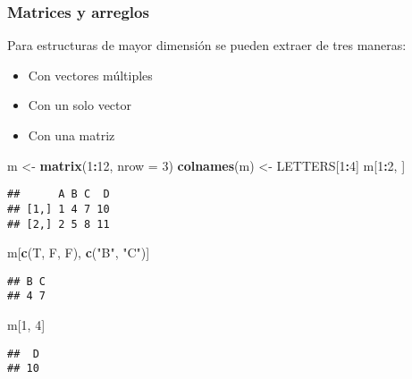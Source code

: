 \documentclass[]{article}
\newenvironment{Shaded}{\begin{snugshade}}{\end{snugshade}}
\newcommand{\KeywordTok}[1]{\textcolor[rgb]{0.13,0.29,0.53}{\textbf{#1}}}
\newcommand{\DataTypeTok}[1]{\textcolor[rgb]{0.13,0.29,0.53}{#1}}
\newcommand{\DecValTok}[1]{\textcolor[rgb]{0.00,0.00,0.81}{#1}}
\newcommand{\StringTok}[1]{\textcolor[rgb]{0.31,0.60,0.02}{#1}}
\newcommand{\OperatorTok}[1]{\textcolor[rgb]{0.81,0.36,0.00}{\textbf{#1}}}
\newcommand{\NormalTok}[1]{#1}
\providecommand{\tightlist}{%
  \setlength{\itemsep}{0pt}\setlength{\parskip}{0pt}}
\begin{document}
\subsubsection{Matrices y arreglos}\label{matrices-y-arreglos}

Para estructuras de mayor dimensión se pueden extraer de tres maneras:

\begin{itemize}
\tightlist
\item
  Con vectores múltiples
\item
  Con un solo vector
\item
  Con una matriz
\end{itemize}

\begin{Shaded}
\begin{Highlighting}[]
\NormalTok{m <-}\StringTok{ }\KeywordTok{matrix}\NormalTok{(}\DecValTok{1}\OperatorTok{:}\DecValTok{12}\NormalTok{, }\DataTypeTok{nrow =} \DecValTok{3}\NormalTok{)}
\KeywordTok{colnames}\NormalTok{(m) <-}\StringTok{ }\NormalTok{LETTERS[}\DecValTok{1}\OperatorTok{:}\DecValTok{4}\NormalTok{]}
\NormalTok{m[}\DecValTok{1}\OperatorTok{:}\DecValTok{2}\NormalTok{, ]}
\end{Highlighting}
\end{Shaded}

\begin{verbatim}
##      A B C  D
## [1,] 1 4 7 10
## [2,] 2 5 8 11
\end{verbatim}

\begin{Shaded}
\begin{Highlighting}[]
\NormalTok{m[}\KeywordTok{c}\NormalTok{(T, F, F), }\KeywordTok{c}\NormalTok{(}\StringTok{"B"}\NormalTok{, }\StringTok{"C"}\NormalTok{)]}
\end{Highlighting}
\end{Shaded}

\begin{verbatim}
## B C 
## 4 7
\end{verbatim}

\begin{Shaded}
\begin{Highlighting}[]
\NormalTok{m[}\DecValTok{1}\NormalTok{, }\DecValTok{4}\NormalTok{]}
\end{Highlighting}
\end{Shaded}

\begin{verbatim}
##  D 
## 10
\end{verbatim}
\end{document}
